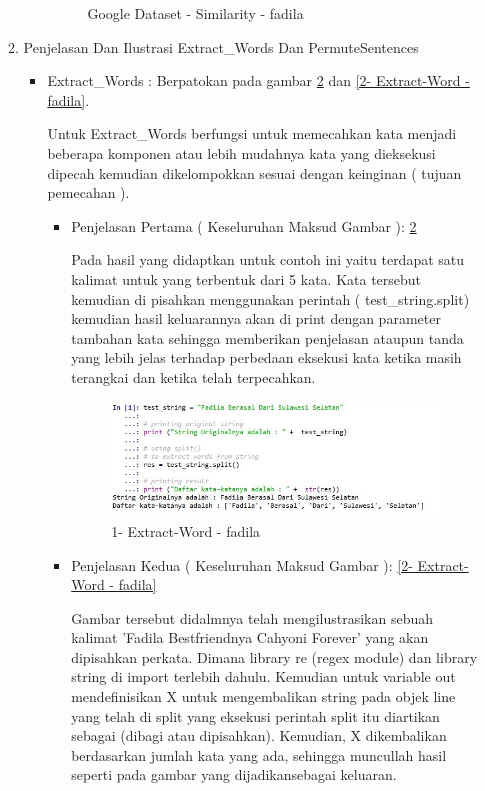 \begin{enumerate}
\begin{enumerate}
\begin{enumerate}
\begin{figure}[!hbtp]
\caption{Google Dataset - Similarity - fadila}
\label{Google Dataset - Similarity - fadila}
\end{figure}
\par
\end{enumerate}
\par
\par
\par
\par
\item Penjelasan Dan Ilustrasi Extract\_Words Dan PermuteSentences
\begin{itemize}
\item Extract\_Words :  Berpatokan pada gambar \ref{1- Extract-Word - fadila} dan  \ref{2- Extract-Word - fadila}.
\par Untuk Extract\_Words berfungsi untuk memecahkan kata menjadi beberapa komponen atau lebih mudahnya kata yang dieksekusi dipecah kemudian dikelompokkan sesuai dengan keinginan ( tujuan pemecahan ).
\begin{itemize}
\item Penjelasan Pertama ( Keseluruhan Maksud Gambar ): \ref{1- Extract-Word - fadila}
\par Pada hasil yang didaptkan untuk contoh ini yaitu terdapat satu kalimat untuk yang terbentuk dari 5 kata. Kata tersebut kemudian di pisahkan menggunakan perintah ( test\_string.split) kemudian hasil keluarannya akan di print dengan parameter tambahan kata sehingga memberikan penjelasan ataupun tanda yang lebih jelas terhadap perbedaan eksekusi kata ketika masih terangkai dan ketika telah terpecahkan.
\par
\begin{figure}[!hbtp]
\centering
\includegraphics[scale=0.3]{figures/extract-word-fadila.jpg}
\caption{1- Extract-Word - fadila}
\label{1- Extract-Word - fadila}
\end{figure}
\par
\item Penjelasan Kedua ( Keseluruhan Maksud Gambar ): \ref{2- Extract-Word - fadila}
\par  Gambar tersebut didalmnya telah mengilustrasikan sebuah kalimat 'Fadila Bestfriendnya Cahyoni Forever' yang  akan dipisahkan perkata. Dimana library re (regex module) dan library string di import terlebih dahulu. Kemudian untuk variable out mendefinisikan X untuk mengembalikan string pada objek line yang telah di split yang eksekusi perintah split itu diartikan sebagai (dibagi atau dipisahkan). Kemudian, X dikembalikan berdasarkan jumlah kata yang ada, sehingga muncullah hasil seperti pada gambar yang dijadikansebagai keluaran.

\end{itemize}
\end{itemize}
\end{enumerate}
\end{enumerate}
